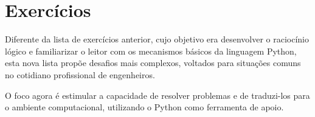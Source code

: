 \chapter{Exercícios}\label{ex}

Diferente da lista de exercícios anterior, cujo objetivo era desenvolver o raciocínio lógico e familiarizar o
leitor com os mecanismos básicos da linguagem Python, esta nova lista propõe desafios mais complexos, voltados para
situações comuns no cotidiano profissional de engenheiros.

O foco agora é estimular a capacidade de resolver problemas e de traduzi-los para o ambiente computacional, utilizando
o Python como ferramenta de apoio.


